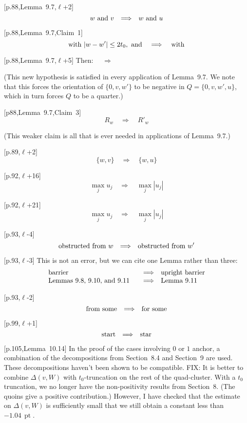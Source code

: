 \documentclass[11pt]{amsart}
\def\to{{\quad\Longrightarrow\quad}}
\def\line{$\ell$}
\def\text{\hbox}
\begin{document}
[p.88,Lemma~9.7,\line+2] 
	$$
	w\text{ and } v\to w \text{ and } u
	$$
	
[p.88,Lemma~9.7,Claim~1]
	$$
	\text{ with } |w - w'|\le 2t_0, \text{ and }
	\to \text{ with }
	$$
	
[p.88,Lemma~9.7,\line+5]
         Then: $\to$



(This new hypothesis is satisfied
        in every application of Lemma~9.7.
        We note that this forces the orientation of $\{0,v,w'\}$ to
        be negative in $Q=\{0,v,w',u\}$, which in turn forces $Q$
        to be a quarter.)

[p88,Lemma~9.7,Claim~3]
        $$
        R_w \to R'_w
        $$

        (This weaker claim is all that is ever needed in applications
        of Lemma~9.7.)

[p.89,\line+2]
	$$
	\{w,v\}\to\{w,u\}
	$$

[p.92,\line+16]
        $$
        \max_j u_j \to \max_j |u_j|
        $$

[p.92,\line+21]
        $$
        \max_j u_j \to \max_j |u_j|
        $$
	
[p.93,\line-4]
	$$
	\text{obstructed from }w \to
	\text{obstructed from }w'
	$$
	
	
[p.93,\line-3] This is not an error, but we
	can cite one Lemma rather than three:
		$$
		\begin{array}{lll}
		\text{barrier} &\to \text{upright barrier}\\
		\text{Lemmas~9.8, 9.10, and 9.11} &\to
		\text{Lemma~9.11}
		\end{array}
		$$
		
[p.93,\line-2]
	$$
	\text{from some} \to \text{for some}
	$$

[p.99,\line+1]
        $$
        \text{start} \to \text{star}
        $$

[p.105,Lemma~10.14]  In the proof of the cases involving
   $0$ or $1$ anchor, a combination of the decompositions from
   Section~8.4 and Section~9 are used.  These decompositions haven't
   been shown to be compatible.  
   FIX: It is better to combine
   $\Delta(v,W)$ with $t_0$-truncation on the rest of the quad-cluster.
   With a $t_0$ truncation, we no longer have the non-positivity results
   from Section~8.  (The quoins give a positive contribution.) However,
   I have checked that
   the estimate on $\Delta(v,W)$ is sufficiently small that we still
   obtain a constant less than $-1.04\,\operatorname{pt}$.
   
\end{document}
